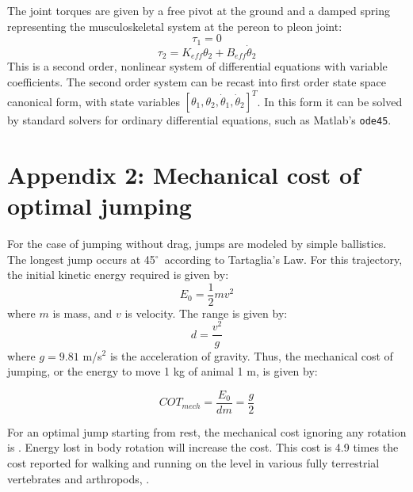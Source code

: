 \documentclass{jeb}
\newcommand{\degree}{$^\circ$}
\begin{document}
The joint torques are given by a free pivot at the ground and a damped spring representing the musculoskeletal system at the pereon to pleon joint:
\begin{equation}
\tau_1 = 0
\end{equation}
\begin{equation}
\tau_2 = K_{eff} \theta_2 + B_{eff} \dot{\theta}_2
\end{equation}
This is a second order, nonlinear system of differential equations with variable coefficients.  The second order system can be recast into first order state space canonical form, with state variables $[\theta_1, \theta_2, \dot\theta_1, \dot\theta_2]^T$.  In this form it can be solved by standard solvers for ordinary differential equations, such as Matlab's {\tt ode45}.   

\section{Appendix 2: Mechanical cost of optimal jumping}
For the case of jumping without drag, jumps are modeled by simple ballistics.  The longest jump occurs at 45\degree~according to Tartaglia's Law.  For this trajectory, the initial kinetic energy required is given by:
\begin{equation}
E_0 = \frac{1}{2} m v^2
\end{equation}
where $m$ is mass, and $v$ is velocity.  The range is given by:
\begin{equation}
d = \frac{v^2}{g}
\end{equation}
where  $g = 9.81$ m/s$^2$ is the acceleration of gravity.  Thus, the mechanical cost of jumping, or the energy to move 1 kg of animal 1 m, is given by:

\begin{equation}
COT_{mech} = \frac{E_0}{dm} = \frac{g}{2}
\end{equation}

For an optimal jump starting from rest, the mechanical cost ignoring any rotation is .  Energy lost in body rotation will increase the cost.  This cost is 4.9 times the cost reported for walking and running on the level in various fully terrestrial vertebrates and arthropods,  \citep{Full:2001}. 



\end{document}
